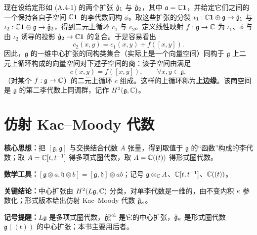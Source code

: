 
现在设给定形如 (A.4-1) 的两个扩张 $\hat{\mathfrak{g}}_1$ 与 $\hat{\mathfrak{g}}_2$，其中 $\mathfrak a=\mathbb{C}\mathbf 1$，并给定它们之间的一个保持各自子空间 $\mathbb{C}\mathbf 1$ 的李代数同构 $\phi$。取这些扩张的分裂 $\iota_1:\mathbb{C}\mathbf 1\oplus\mathfrak g\to\hat{\mathfrak{g}}_1$ 与 $\iota_2:\mathbb{C}\mathbf 1\oplus\mathfrak g\to\hat{\mathfrak{g}}_2$，得到二元上循环 $c_1$ 与 $c_2$。定义线性映射 $f:\mathfrak g\to\mathbb{C}$ 为 $\iota_1$、$\phi$ 与由 $\iota_2$ 诱导的投影 $\hat{\mathfrak{g}}_2\to\mathbb{C}\mathbf 1$ 的复合。于是容易看出
\[
    c_2(x,y)=c_1(x,y)+f([x,y]).
\]
因此，$\mathfrak g$ 的一维中心扩张的同构类集合（实际上是一个向量空间）同构于 $\mathfrak g$ 上二元上循环构成的向量空间对下述子空间的商：该子空间由满足
\[
    c(x,y)=f([x,y]),\qquad \forall x,y\in\mathfrak g,
\]
（对某个 $f:\mathfrak g\to\mathbb{C}$）的二元上循环 $c$ 组成。这样的上循环称为\textbf{上边缘}。该商空间是 $\mathfrak g$ 的第二李代数上同调群，记作 $H^2(\mathfrak g,\mathbb{C})$。


\section{仿射 Kac--Moody 代数}

\begin{keypoints}
    \item \textbf{核心思想：}把 $[\mathfrak g,\mathfrak g]$ 与交换结合代数 $A$ 张量，得到取值于 $\mathfrak g$ 的“函数”构成的李代数；取 $A=\mathbb{C}[t,t^{-1}]$ 得多项式圈代数，取 $A=\mathbb{C}((t))$ 得形式圈代数。
    \item \textbf{数学工具：}$[\mathfrak g\otimes a,\mathfrak h\otimes b]=[\mathfrak g,\mathfrak h]\otimes ab$；记号 $\mathfrak g\otimes_{\mathbb{C}} A$、$\mathbb{C}[t,t^{-1}]$、$\mathbb{C}((t))$。
    \item \textbf{关键结论：}中心扩张由 $H^2(L\mathfrak g,\mathbb{C})$ 分类，对单李代数是一维的，由不变内积 $\kappa$ 参数化；形式版本给出仿射 Kac--Moody 代数 $\hat{\mathfrak{g}}_\kappa$。
    \item \textbf{记号提醒：}$L\mathfrak g$ 是多项式圈代数，$\hat{\mathfrak{g}}^{\mathrm{pol}}_\kappa$ 是它的中心扩张，$\hat{\mathfrak{g}}_\kappa$ 是形式圈代数 $\mathfrak g(\!(t)\!)$ 的中心扩张；本书主要用后者。
\end{keypoints}

